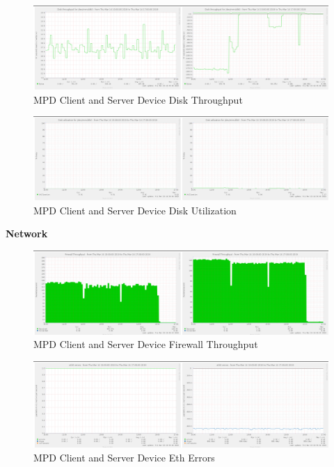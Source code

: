 \documentclass[11pt,a4paper,headinclude=false,footinclude=false]{scrreprt}
\begin{document}
\begin{figure}[H]
\includegraphics{ResultsAndAnalysis/MPDServerTestImages/007MPDDiskThroughput.png}
\centering
\caption{MPD Client and Server Device Disk Throughput}
\label{MPDDiskThroughput}
\end{figure}

\begin{figure}[H]
\includegraphics{ResultsAndAnalysis/MPDServerTestImages/008MPDDiskUtilization.png}
\centering
\caption{MPD Client and Server Device Disk Utilization}
\label{MPDDiskUtil}
\end{figure}

\textbf{Network}

\begin{figure}[H]
\includegraphics{ResultsAndAnalysis/MPDServerTestImages/011MPDFirewallThroughput.png}
\centering
\caption{MPD Client and Server Device Firewall Throughput}
\label{MPDFirewallThroughput}
\end{figure}

\begin{figure}[H]
\includegraphics{ResultsAndAnalysis/MPDServerTestImages/009MPDEth0Errors.png}
\centering
\caption{MPD Client and Server Device Eth Errors}
\label{MPDEthError}
\end{figure}
\end{document}
